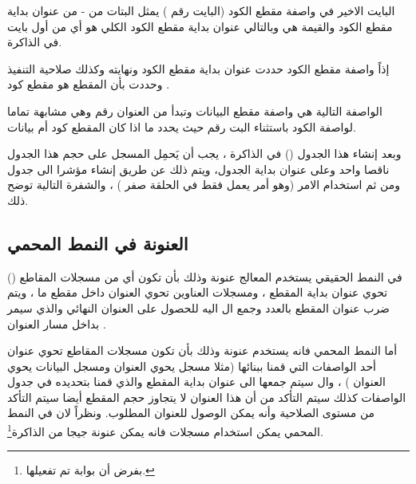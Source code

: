 \documentclass[document.tex]{subfiles}
\begin{document}
البايت الاخير في واصفة مقطع الكود (البايت رقم ) يمثل البتات من - من عنوان بداية مقطع الكود والقيمة هي  وبالتالي عنوان بداية مقطع الكود الكلي هو  أي من أول بايت في الذاكرة.

إذاً واصفة مقطع الكود   حددت عنوان بداية مقطع الكود ونهايته وكذلك صلاحية التنفيذ وحددت بأن المقطع هو مقطع كود .

الواصفة التالية هي واصفة مقطع البيانات   وتبدأ من العنوان رقم  وهي مشابهة تماما لواصفة الكود باستثناء البت رقم  حيث يحدد ما اذا كان المقطع كود أم بيانات.

وبعد إنشاء هذا الجدول () في الذاكرة ، يجب أن يَحمِل المسجل   على حجم هذا الجدول ناقصا واحد وعلى عنوان بداية الجدول، ويتم ذلك عن طريق إنشاء مؤشرا الى جدول  ومن ثم  استخدام الامر  (وهو أمر يعمل فقط في الحلقة صفر ) ، والشفرة التالية توضح ذلك.

\begin{english}
\lstset{numberstyle=\tiny,numbersep=5pt,tabsize=2,extendedchars=true,breaklines=true,frame=b,showspaces=false, showtabs=false,xleftmargin=10pt,framexleftmargin=10pt,framexrightmargin=5pt,framexbottommargin=4pt,showstringspaces=false,language=[x86masm]Assembler}


\end{english}

\subsection{العنونة في النمط المحمي }
في النمط الحقيقي يستخدم المعالج عنونة  وذلك بأن تكون أي من مسجلات المقاطع () تحوي عنوان بداية المقطع ، ومسجلات العناوين تحوي العنوان داخل مقطع ما ، ويتم ضرب عنوان المقطع بالعدد  وجمع ال  اليه للحصول على العنوان النهائي والذي سيمر بداخل مسار العنوان .

أما النمط المحمي  فانه يستخدم عنونة  وذلك بأن تكون مسجلات المقاطع تحوي عنوان أحد الواصفات التي قمنا ببنائها (مثلا مسجل  يحوي العنوان  ومسجل البيانات  يحوي العنوان ) ، وال  سيتم جمعها الى عنوان بداية المقطع   والذي قمنا بتحديده في جدول الواصفات كذلك سيتم التأكد من أن هذا العنوان لا يتجاوز حجم المقطع  أيضا سيتم التأكد من مستوى الصلاحية وأنه يمكن الوصول للعنوان المطلوب. ونظراً لان في النمط المحمي يمكن استخدام مسجلات  فانه يمكن عنونة  جيجا من الذاكرة\footnote{بفرض أن بوابة  تم تفعيلها.}.
\end{document}
